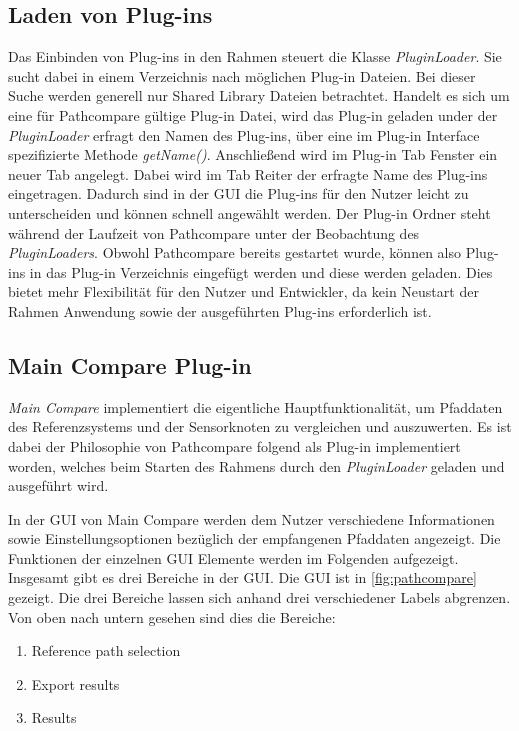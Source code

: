 \subsection{Laden von Plug-ins}
Das Einbinden von Plug-ins in den Rahmen steuert die Klasse
\textit{PluginLoader}. Sie sucht dabei in einem Verzeichnis nach möglichen
Plug-in Dateien. Bei dieser Suche werden generell nur Shared Library
Dateien betrachtet. Handelt es sich um eine für Pathcompare gültige
Plug-in Datei, wird das Plug-in geladen under der \textit{PluginLoader} erfragt
den Namen des Plug-ins,
über eine im Plug-in Interface spezifizierte Methode \textit{getName()}.
Anschließend wird im Plug-in Tab Fenster ein neuer Tab angelegt. Dabei wird im
Tab Reiter der erfragte Name des Plug-ins eingetragen. Dadurch sind in der GUI
die Plug-ins für den Nutzer leicht zu unterscheiden und können schnell
angewählt werden.  Der Plug-in Ordner steht während der Laufzeit von
Pathcompare unter der Beobachtung des \textit{PluginLoaders}.  Obwohl
Pathcompare bereits gestartet wurde, können also Plug-ins in das
Plug-in Verzeichnis eingefügt werden und diese werden geladen. Dies bietet mehr
Flexibilität für den Nutzer und Entwickler, da kein Neustart der Rahmen
Anwendung sowie der ausgeführten Plug-ins erforderlich ist.

\subsection{Main Compare Plug-in}
\label{sub:maincompare}


\textit{Main Compare} implementiert die eigentliche Hauptfunktionalität, um Pfaddaten des
Referenzsystems und der Sensorknoten zu vergleichen und auszuwerten. 
Es ist dabei der Philosophie von Pathcompare folgend als Plug-in
implementiert worden, welches beim Starten des Rahmens durch den
\textit{PluginLoader} geladen und ausgeführt wird.

In der GUI von Main Compare werden dem Nutzer verschiedene Informationen sowie
Einstellungsoptionen bezüglich der
empfangenen Pfaddaten angezeigt. Die Funktionen der einzelnen GUI Elemente
werden im Folgenden aufgezeigt.
Insgesamt gibt es drei Bereiche in der GUI. Die GUI ist in
\autoref{fig:pathcompare} gezeigt. Die drei Bereiche lassen sich anhand drei
verschiedener Labels abgrenzen. Von oben nach untern gesehen sind
dies die Bereiche:

\begin{enumerate}
  \item Reference path selection
  \item Export results
  \item Results
\end{enumerate}


